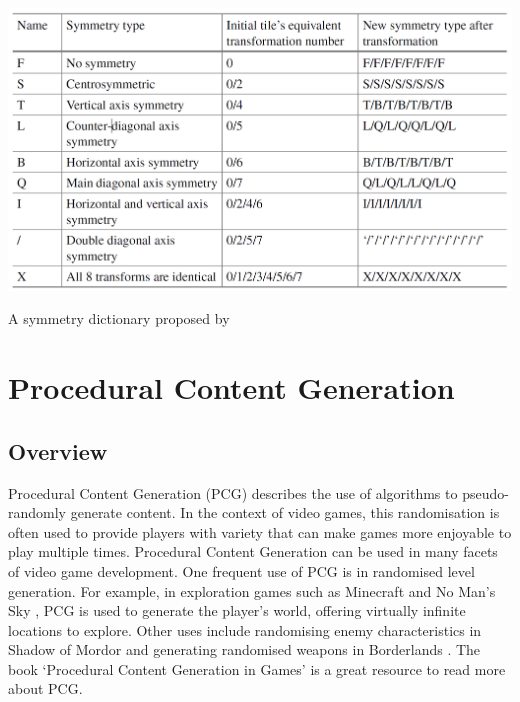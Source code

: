 \begin{table}[H]
    \centering
    \includegraphics[width=\textwidth, height=0.3\textheight, keepaspectratio]{Images/SymmetryDictionary.png}
    \caption{A symmetry dictionary proposed by \cite{WFC_Automatic_Rules_And_Better_Symmetries}}
    \label{fig:symmetryDictionary}
\end{table}

\section{Procedural Content Generation}
\subsection{Overview}
Procedural Content Generation (PCG) describes the use of algorithms to pseudo-randomly generate content. In the context of video games, this randomisation is often used to provide players with variety that can make games more enjoyable to play multiple times. Procedural Content Generation can be used in many facets of video game development. One frequent use of PCG is in randomised level generation. For example, in exploration games such as Minecraft \cite{minecraft} and No Man's Sky \cite{nomanssky}, PCG is used to generate the player's world, offering virtually infinite locations to explore. Other uses include randomising enemy characteristics in Shadow of Mordor \cite{shadowofmordor} and generating randomised weapons in Borderlands \cite{borderlands}. The book `Procedural Content Generation in Games' \cite{pcgbook} is a great resource to read more about PCG.

